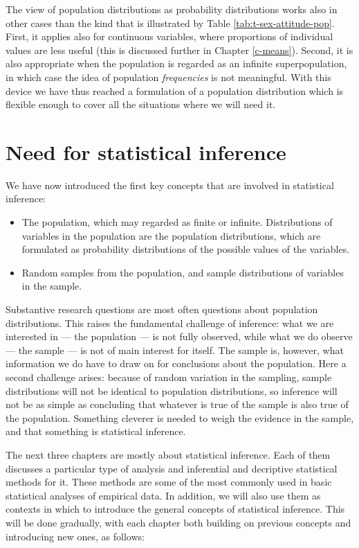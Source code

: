 \documentclass[11pt,a4paper,openany]{book}
\begin{document}
The view of population distributions as probability distributions works
also in other cases than the kind that is illustrated by Table
\ref{tab:t-sex-attitude-pop}. First, it applies also for continuous
variables, where proportions of individual values are less useful (this
is discussed further in Chapter \ref{c-means}). Second, it is also
appropriate when the population is regarded as an infinite
superpopulation, in which case the idea of population \emph{frequencies}
is not meaningful. With this device we have thus reached a formulation
of a population distribution which is flexible enough to cover all the
situations where we will need it.

\section{Need for statistical inference}\label{s-samples-inference}

We have now introduced the first key concepts that are involved in
statistical inference:

\begin{itemize}
\item
  The population, which may regarded as finite or infinite.
  Distributions of variables in the population are the population
  distributions, which are formulated as probability distributions of
  the possible values of the variables.
\item
  Random samples from the population, and sample distributions of
  variables in the sample.
\end{itemize}

Substantive research questions are most often questions about population
distributions. This raises the fundamental challenge of inference: what
we are interested in --- the population --- is not fully observed, while
what we do observe --- the sample --- is not of main interest for
itself. The sample is, however, what information we do have to draw on
for conclusions about the population. Here a second challenge arises:
because of random variation in the sampling, sample distributions will
not be identical to population distributions, so inference will not be
as simple as concluding that whatever is true of the sample is also true
of the population. Something cleverer is needed to weigh the evidence in
the sample, and that something is statistical inference.

The next three chapters are mostly about statistical inference. Each of
them discusses a particular type of analysis and inferential and
decriptive statistical methods for it. These methods are some of the
most commonly used in basic statistical analyses of empirical data. In
addition, we will also use them as contexts in which to introduce the
general concepts of statistical inference. This will be done gradually,
with each chapter both building on previous concepts and introducing new
ones, as follows:
\end{document}
